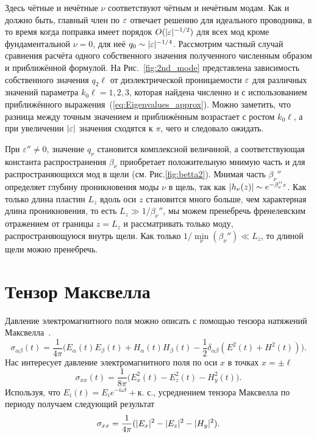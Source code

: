 Здесь чётные и нечётные $\nu$ соответствуют чётным и нечётным модам. Как и должно быть, главный член по $\varepsilon$ отвечает решению для идеального
проводника, в то время когда поправка имеет порядок $O(\lvert\varepsilon\rvert^{-1/2})$ для всех мод кроме фундаментальной $\nu = 0$, для 
неё $q_0 \sim \lvert\varepsilon\rvert^{-1/4}$. Рассмотрим частный случай сравнения расчёта одного собственного значения
полученного численным образом и приближённой формулой. На Рис.~\ref{fig:2nd_mode} представлена зависимость собственного значения $q_2\ell$ от 
диэлектрической проницаемости  $\varepsilon$ для различных значений параметра $k_0 \ell = 1,2,3$, которая найдена численно и с использованием
приближённого выражения~(\ref{eq:Eigenvalues_approx}). Можно заметить, что разница между точным значением и приближённым возрастает с ростом  $k_0 \ell$, а при увеличении $\lvert\varepsilon\rvert$ значения сходятся к $\pi$, чего и следовало ожидать. 

 При $\varepsilon'' \neq 0$, значение $q_\nu$ становится комплексной величиной, а соответствующая константа 
 распространения $\beta_\nu$ приобретает положительную мнимую часть и для распространяющихся мод в щели (см. Рис.\ref{fig:betta2}). Мнимая часть $\beta_\nu''$ определяет
 глубину проникновения моды $\nu$ в щель, так как $\lvert h_\nu(z)\rvert\sim e^{-\beta_\nu'' z}$. Как только длина пластин $L_z$ вдоль оси $z$ становится много больше, чем характерная длина проникновения, то 
 есть $L_z \gg 1/\beta_\nu''$, мы можем пренебречь френелевским отражением от границы $z = L_z$ и рассматривать только моду, распространяющуюся внутрь щели.  Как только $1/\min \limits_{\nu}(\beta_\nu'') \ll L_z$,
 то длиной щели можно пренебречь. 

\section{Тензор Максвелла}

Давление электромагнитного поля можно описать с помощью тензора натяжений Максвелла~\cite{landau}.  \begin{equation*}
  \sigma_{\alpha \beta}(t) = \frac{1}{4 \pi}\Big( E_\alpha(t) E_\beta(t) + H_\alpha(t) H_\beta(t) - \frac{1}{2}\delta_{\alpha \beta}(E^2(t) + H^2(t)) \Big).
\end{equation*} Нас интересует давление электромагнитного поля по оси $x$ в точках $x = \pm \ell$
\begin{equation*}
    \sigma_{xx}(t) = \frac{1}{8 \pi}\Big( E_x^2(t) - E_z^2(t) - H_y^2(t)\Big).
\end{equation*}
Используя, что $E_{i}(t) = E_i e^{-i \omega t} + \text{к. с.}$, усреднением тензора Максвелла по периоду получаем следующий результат
\begin{equation}
    \sigma_{xx} = \frac{1}{4 \pi} (\lvert E_x\rvert^2 -\lvert E_z\rvert^2 - \lvert H_y\rvert^2).
\end{equation}

